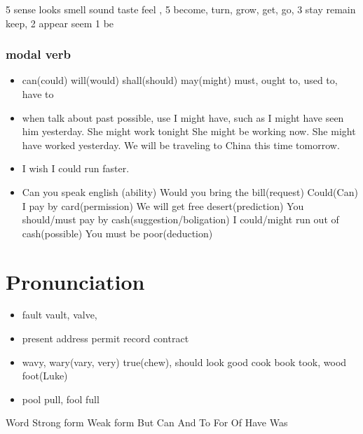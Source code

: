 \documentclass[a4paper,11pt,twoside]{book}
\begin{document}
5 sense looks smell sound taste feel , 5 become, turn, grow, get, go, 3 stay remain keep, 2 appear seem 1 be


\subsection{modal verb}
\begin{itemize}
	\item can(could) will(would) shall(should) may(might) must, ought to, used to, have to
		
	\item when talk about past possible, use I might have, such as I might have seen him yesterday. 
	She might work tonight
	She might be working now.
	She might have worked yesterday. 
	We will be traveling to China this time tomorrow.
	
	\item I wish I could run faster.
	
	\item Can you speak english (ability)
	      Would you bring the bill(request)
	      Could(Can) I pay by card(permission)
	      We will get free desert(prediction)
	      You should/must pay by cash(suggestion/boligation)
	      I could/might run out of cash(possible)
	      You must be poor(deduction)
			
\end{itemize}


\chapter{Pronunciation}
\begin{itemize}
	\item fault vault, valve, 

	\item present address permit record contract 
	
	\item wavy, wary(vary, very) true(chew), should look good cook book took, wood foot(Luke)
	
	\item pool pull, fool full 
\end{itemize}

Word	Strong form	Weak form
But	
Can	
And	
To	
For	
Of	
Have	
Was	
	
\end{document}
